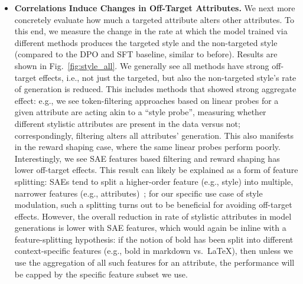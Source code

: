 \documentclass{article} %
\begin{document}
\begin{itemize}[leftmargin=*]
    \item \textbf{Correlations Induce Changes in Off-Target Attributes.} We next more concretely evaluate how much a targeted attribute alters other attributes.
    To this end, we measure the change in the rate at which the model trained via different methods produces the targeted style and the non-targeted style (compared to the DPO and SFT baseline, similar to before).
    Results are shown in Fig.~\ref{fig:style_all}.
    We generally see all methods have strong off-target effects, i.e., not just the targeted, but also the non-targeted style's rate of generation is reduced.
    This includes methods that showed strong aggregate effect: e.g., we see token-filtering approaches based on linear probes for a given attribute are acting akin to a ``style probe'', measuring whether different stylistic attributes are present in the data versus not; correspondingly, filtering alters all attributes' generation.
    This also manifests in the reward shaping case, where the same linear probes perform poorly.
    Interestingly, we see SAE features based filtering and reward shaping has lower off-target effects.
    This result can likely be explained as a form of feature splitting: SAEs tend to split a higher-order feature (e.g., style) into multiple, narrower features (e.g., attributes)~\citep{chanin2025absorptionstudyingfeaturesplitting}; for our specific use case of style modulation, such a splitting turns out to be beneficial for avoiding off-target effects.
    However, the overall reduction in rate of stylistic attributes in model generations is lower with SAE features, which would again be inline with a feature-splitting hypothesis: if the notion of bold has been split into different context-specific features (e.g., bold in markdown vs.\ LaTeX), then unless we use the aggregation of all such features for an attribute, the performance will be capped by the specific feature subset we use.
    
\end{itemize}
\end{document}
